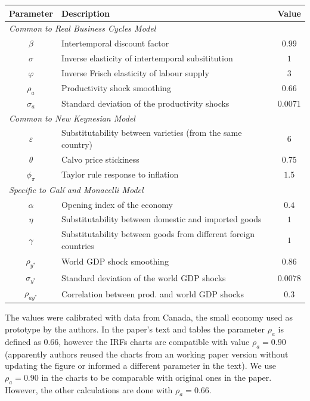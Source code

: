 \documentclass{article}
\begin{document}
\begin{minipage}{0.76\textwidth}
    \begin{table}[H]
        \centering
        \begin{tabular}{clc}
            \hline
            \textbf{Parameter} & \textbf{Description} & \textbf{Value}\\
            \hline
            \multicolumn{3}{l}{\textit{Common to Real Business Cycles Model}}\\
            $\beta$ & Intertemporal discount factor & $0.99$\\
            $\sigma$ & Inverse elasticity of intertemporal subsititution & $1$\\
            $\varphi$ & Inverse Frisch elasticity of labour supply & $3$\\
            $\rho_a$ & Productivity shock smoothing & $0.66$\\
            $\sigma_a$ & Standard deviation of the productivity shocks & $0.0071$ \\
            \multicolumn{3}{l}{\textit{Common to New Keynesian Model}}\\
            $\varepsilon$ & Substitutability between varieties (from the same country) & $6$\\
            $\theta$ & Calvo price stickiness & $0.75$\\
            $\phi_\pi$ & Taylor rule response to inflation & $1.5$ \\
            \multicolumn{3}{l}{\textit{Specific to Galí and Monacelli Model}}\\
            $\alpha$ & Opening index of the economy  & $0.4$\\
            $\eta$ & Substitutability between domestic and imported goods & $1$\\
            $\gamma$ & Substitutability between goods from different foreign countries & $1$\\
            $\rho_{y^*}$ & World GDP shock smoothing & $0.86$\\
            $\sigma_{y^*}$ & Standard deviation of the world GDP shocks & $0.0078$ \\
            $\rho_{ay^*}$ & Correlation between prod. and world GDP shocks & $0.3$ \\
            \hline
        \end{tabular}
    \end{table}
\end{minipage}
\begin{minipage}{0.23\textwidth}
    The values were calibrated with data from Canada, the small economy used as prototype by the authors. In the paper's text and tables the parameter $\rho_a$ is defined as $0.66$, however the IRFs charts are compatible with value $\rho_a = 0.90$ (apparently authors reused the charts from an working paper version \citep{gali_monacelli2002} without updating the figure or informed a different parameter in the text). We use $\rho_a = 0.90$ in the charts to be comparable with original ones in the paper. However, the other calculations are done with $\rho_a = 0.66$.
\end{minipage}
\end{document}
